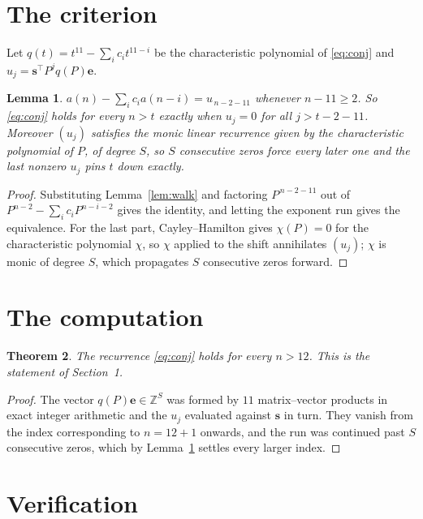 \documentclass[11pt,a4paper]{article}
\theoremstyle{plain}
\newtheorem{theorem}{Theorem}
\newtheorem{lemma}[theorem]{Lemma}
\theoremstyle{definition}
\begin{document}
\section{The criterion}

Let $q(t)=t^{11}-\sum_i c_i t^{11-i}$ be the characteristic polynomial of
\eqref{eq:conj} and $u_j=\mathbf{s}^{\!\top}P^{j}q(P)\mathbf{e}$.

\begin{lemma}\label{lem:crit}
$a(n)-\sum_i c_i a(n-i)=u_{\,n-2-11}$ whenever $n-11\ge2$. So \eqref{eq:conj}
holds for every $n>t$ exactly when $u_j=0$ for all $j>t-2-11$. Moreover $(u_j)$
satisfies the monic linear recurrence given by the characteristic polynomial of $P$, of
degree $S$, so $S$ consecutive zeros force every later one and the last nonzero $u_j$ pins
$t$ down exactly.
\end{lemma}

\begin{proof}
Substituting Lemma~\ref{lem:walk} and factoring $P^{\,n-2-11}$ out of
$P^{n-2}-\sum_i c_i P^{n-i-2}$ gives the identity, and letting the exponent run gives the
equivalence. For the last part, Cayley--Hamilton gives $\chi(P)=0$ for the characteristic
polynomial $\chi$, so $\chi$ applied to the shift annihilates $(u_j)$; $\chi$ is monic of
degree $S$, which propagates $S$ consecutive zeros forward.
\end{proof}

\section{The computation}

\begin{theorem}
The recurrence \eqref{eq:conj} holds for every $n>12$. This is the statement of
Section~1.
\end{theorem}

\begin{proof}
The vector $q(P)\mathbf{e}\in\mathbb{Z}^{S}$ was formed by $11$ matrix--vector
products in exact integer arithmetic and the $u_j$ evaluated against $\mathbf{s}$ in turn.
They vanish from the index corresponding to $n=12+1$ onwards, and the run was continued
past $S$ consecutive zeros, which by Lemma~\ref{lem:crit} settles every larger index.
\end{proof}

\section{Verification}
\end{document}
